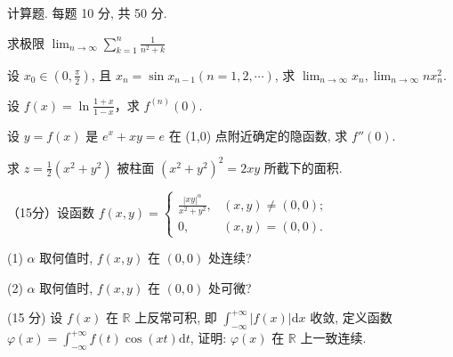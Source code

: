 \par{}
计算题. 每题 10 分, 共 50 分.\par
求极限 $\lim_{n\to \infty}\sum_{k = 1}^{n}\frac{1}{n^2 + k}$\par
设 $x_0 \in \left(0, \frac{\pi}{2}\right)$, 且 $x_n = \sin x_{n-1} (n = 1, 2, \cdots)$, 求 $\lim_{n \to \infty} x_n, \lim_{n \to \infty} n x_n^2$.\par
设 $f(x) = \ln \frac{1 + x}{1 - x}$，求 $f^{(n)}(0)$.\par
设 $y = f(x)$ 是 $e^x + xy = e$ 在 (1,0) 点附近确定的隐函数, 求 $f''(0)$.\par
求 $z = \frac{1}{2} (x^2 + y^2)$ 被柱面 $(x^2 + y^2)^2 = 2xy$ 所截下的面积.\par
\par{}
（15分）设函数 $f(x,y) = \left\{ \begin{array}{ll}\frac{|xy|^{\alpha}}{x^{2} + y^{2}}, & (x,y)\neq (0,0);\\ 0, & (x,y) = (0,0). \end{array} \right.$\par
(1) $\alpha$ 取何值时, $f(x,y)$ 在 $(0,0)$ 处连续?\par
(2) $\alpha$ 取何值时, $f(x,y)$ 在 $(0,0)$ 处可微?\par
\par{}
(15 分) 设 $f(x)$ 在 $\mathbb{R}$ 上反常可积, 即 $\int_{-\infty}^{+\infty}|f(x)|\mathrm{d}x$ 收敛, 定义函数 $\varphi(x) = \int_{-\infty}^{+\infty}f(t)\cos (xt)\mathrm{d}t$, 证明: $\varphi(x)$ 在 $\mathbb{R}$ 上一致连续.\par
\par{}
